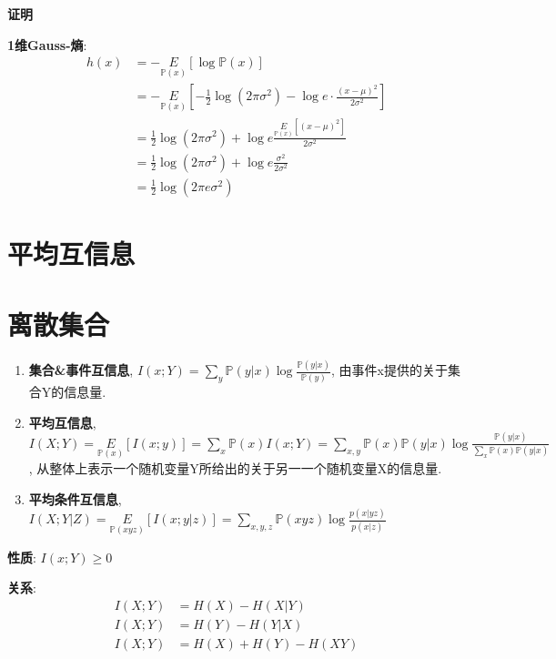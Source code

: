 \documentclass{article}
\newcommand{\env}[2]{\begin{#1}#2\end{#1}}
\newcommand{\defi}[2]{\textbf{#1}, #2}
\newcommand{\proof}[1]{\textbf{证明} #1}
\newcommand{\P}{\mathbb P}
\begin{document}
                    \proof{\par
                        \textbf{1维Gauss-熵}: 
                        \env{align*}{
                            h(x) 
                            &= -\underset{\P(x)}{E}[\log \P(x)]\\
                            &= -\underset{\P(x)}{E}\left[-\frac{1}{2}\log(2\pi\sigma^2) - \log e · \frac{(x-\mu)^2}{2\sigma ^2}  \right]\\
                            &= \frac{1}{2}\log(2\pi\sigma^2) + \log e \frac{\underset{\P(x)}{E}\left[(x-\mu)^2\right]}{2\sigma ^2}\\
                            &= \frac{1}{2}\log(2\pi\sigma^2) + \log e \frac{\sigma ^2}{2\sigma ^2}\\
                            &= \frac{1}{2}\log(2\pi e\sigma^2)
                        }
                    }

        \section{平均互信息}
            \section{离散集合}
                \env{enumerate}{
                    \item \defi{集合&事件互信息}{$I(x ; Y)=\sum\limits_{y} \P(y|x) \log \frac{\P(y|x)}{\P(y)}$, 由事件x提供的关于集合Y的信息量.}
                    \item \defi{平均互信息}{$I(X ; Y) = \underset{\P(x)}{E}[I(x ; y)] = \sum\limits_{x} \P(x) I(x ; Y)=\sum\limits_{x, y} \P(x) \P(y|x) \log \frac{\P(y|x)}{\sum\limits_{x} \P(x) \P(y|x)}$, 从整体上表示一个随机变量Y所给出的关于另一一个随机变量X的信息量.}
                    \item \defi{平均条件互信息}{$I(X ; Y|Z)=\underset{\P(x y z)}{E}[I(x ; y|z)]=\sum\limits_{x, y, z} \P(x y z) \log \frac{p(x|y z)}{p(x|z)}$}
                }
                
                \textbf{性质}: $I(x ; Y) \ge 0$
                
                \textbf{关系}: 
                    \env{align*}{
                        I(X ; Y) &= H(X)-H(X|Y) \\
                        I(X ; Y) &= H(Y)-H(Y|X) \\
                        I(X ; Y) &= H(X)+H(Y)-H(X Y)
                    }
             
\end{document}

